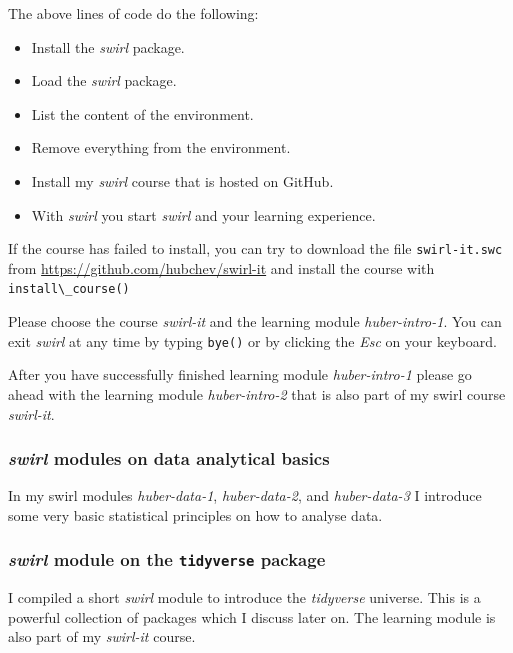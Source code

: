 \documentclass[
  12pt,
  oneside]{book}
\providecommand{\tightlist}{%
  \setlength{\itemsep}{0pt}\setlength{\parskip}{0pt}}
\begin{document}
The above lines of code do the following:

\begin{itemize}
\tightlist
\item
  Install the \emph{swirl} package.
\item
  Load the \emph{swirl} package.
\item
  List the content of the environment.
\item
  Remove everything from the environment.
\item
  Install my \emph{swirl} course that is hosted on GitHub.
\item
  With \emph{swirl} you start \emph{swirl} and your learning experience.
\end{itemize}

If the course has failed to install, you can try to download the file \texttt{swirl-it.swc} from \url{https://github.com/hubchev/swirl-it} and install the course with \texttt{install\textbackslash{}\_course()}

Please choose the course \emph{swirl-it} and the learning module \emph{huber-intro-1}.
You can exit \emph{swirl} at any time by typing \texttt{bye()} or by clicking the \emph{Esc} on your keyboard.

After you have successfully finished learning module \emph{huber-intro-1} please go ahead with the learning module \emph{huber-intro-2} that is also part of my swirl course \emph{swirl-it}.

\hypertarget{swirl-modules-on-data-analytical-basics}{%
\subsubsection*{\texorpdfstring{\emph{swirl} modules on data analytical basics}{swirl modules on data analytical basics}}\label{swirl-modules-on-data-analytical-basics}}

In my swirl modules \emph{huber-data-1}, \emph{huber-data-2}, and \emph{huber-data-3} I introduce some very basic statistical principles on how to analyse data.

\hypertarget{swirl-module-on-the-tidyverse-package}{%
\subsubsection*{\texorpdfstring{\emph{swirl} module on the \texttt{tidyverse} package}{swirl module on the tidyverse package}}\label{swirl-module-on-the-tidyverse-package}}

I compiled a short \emph{swirl} module to introduce the \emph{tidyverse} universe. This is a powerful collection of packages which I discuss later on. The learning module is also part of my \emph{swirl-it} course.
\end{document}
